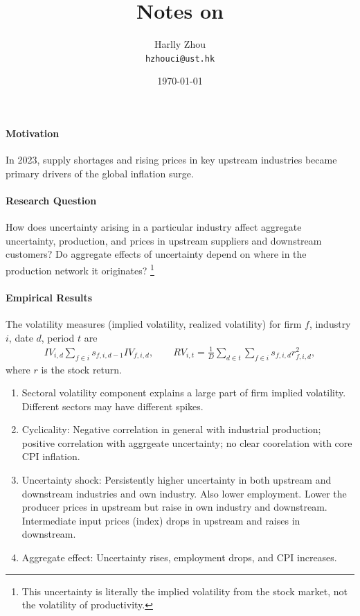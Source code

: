 \documentclass[12pt]{article}
\title{Notes on \cite{cacciatoreUncertaintyProductionNetwork2025}}
\author{Harlly Zhou \\ \texttt{hzhouci@ust.hk}}
\date{\today}
\numberwithin{equation}{section}
\begin{document}
\maketitle

\paragraph{Motivation} In 2023, supply shortages and rising prices in key upstream industries became primary drivers of the global inflation surge.

\paragraph{Research Question} How does uncertainty arising in a particular industry affect aggregate uncertainty, production, and prices in upstream suppliers and downstream customers? Do aggregate effects of uncertainty depend on where in the production network it originates? \footnote{This uncertainty is literally the implied volatility from the stock market, not the volatility of productivity.}

\paragraph{Empirical Results} 
The volatility measures (implied volatility, realized volatility) for firm $f$, industry $i$, date $d$, period $t$ are
\begin{align*}
    IV_{i,d} \sum_{f\in i} s_{f,i,d-1} IV_{f,i,d}, \qquad RV_{i,t} = \frac{1}{D} \sum_{d\in t} \sum_{f\in i} s_{f,i,d} r^2_{f,i,d},
\end{align*}
where $r$ is the stock return.
\begin{enumerate}
    \item Sectoral volatility component explains a large part of firm implied volatility. Different sectors may have different spikes. 
    \item Cyclicality: Negative correlation in general with industrial production; positive correlation with aggrgeate uncertainty; no clear coorelation with core CPI inflation.
    \item Uncertainty shock: Persistently higher uncertainty in both upstream and downstream industries and own industry. Also lower employment. Lower the producer prices in upstream but raise in own industry and downstream. Intermediate input prices (index) drops in upstream and raises in downstream.
    \item Aggregate effect: Uncertainty rises, employment drops, and CPI increases.
\end{enumerate}
\end{document}
